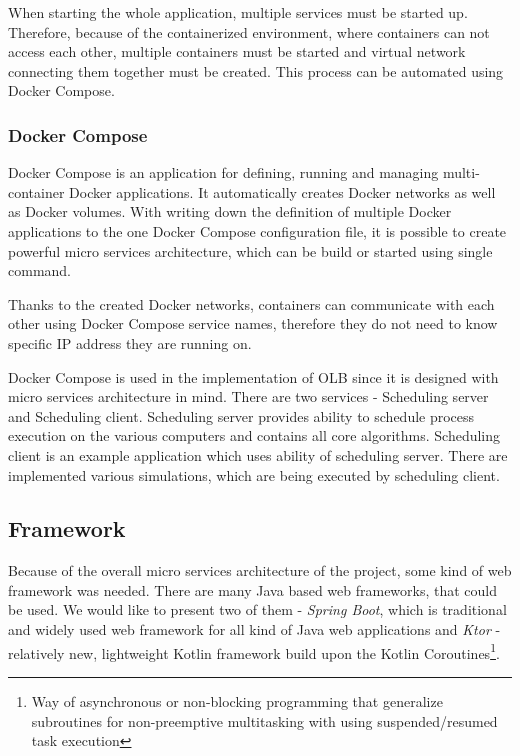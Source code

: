 When starting the whole application, 
multiple services must be started up.
Therefore, because of the containerized environment,
where containers can not access each other,
multiple containers must be started and virtual network connecting them together must be created.
This process can be automated using Docker Compose.

\subsubsection{Docker Compose}
Docker Compose\cite{dockerComposeReference} is an application for defining, running and managing multi-container Docker applications.
It automatically creates Docker networks as well as Docker volumes.
With writing down the definition of multiple Docker applications to the one Docker Compose configuration file,
it is possible to create powerful micro services architecture, 
which can be build or started using single command.

Thanks to the created Docker networks,
containers can communicate with each other using Docker Compose service names,
therefore they do not need to know specific IP address they are running on.

Docker Compose is used in the implementation of OLB since it is designed with micro services architecture in mind.
There are two services - Scheduling server and Scheduling client.
Scheduling server provides ability to schedule process execution on the various computers
and contains all core algorithms.
Scheduling client is an example application which uses ability of scheduling server. 
There are implemented various simulations,
which are being executed by scheduling client.  

\subsection{Framework}\label{subsec:framework}
Because of the overall micro services architecture of the project,
some kind of web framework was needed.
There are many Java based web frameworks,
that could be used. 
We would like to present two of them - \textit{Spring Boot}, 
which is traditional and widely used web framework for all kind of Java web applications
and \textit{Ktor} - relatively new, 
lightweight Kotlin framework build upon the Kotlin Coroutines\footnote{Way of asynchronous or non-blocking programming
that generalize subroutines for non-preemptive multitasking with using suspended/resumed task execution}.


